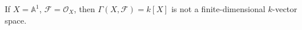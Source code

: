 If $X = \mathbb{A}^1$, $\mathcal{F} = \mathcal{O}_X$, then $\Gamma(X, \mathcal{F}) = k[X]$ is not a finite-dimensional
$k$-vector space.
